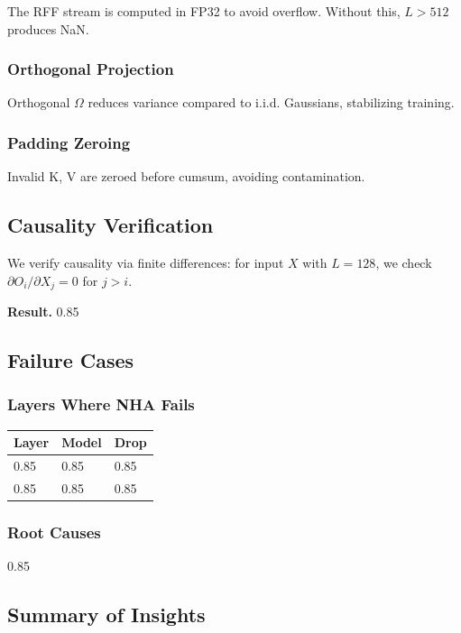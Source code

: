 The RFF stream is computed in FP32 to avoid overflow. Without this, 
$L > 512$ produces NaN.

\subsubsection{Orthogonal Projection}

Orthogonal $\Omega$ reduces variance compared to i.i.d. Gaussians, 
stabilizing training.

\subsubsection{Padding Zeroing}

Invalid K, V are zeroed before cumsum, avoiding contamination.

\subsection{Causality Verification}

We verify causality via finite differences: for input $X$ with $L = 128$, 
we check $\partial O_i / \partial X_j = 0$ for $j > i$.

\textbf{Result.} 0.85

\subsection{Failure Cases}

\subsubsection{Layers Where NHA Fails}

\begin{table}[H]
\centering
\small
\begin{tabular}{lll}
\toprule
\textbf{Layer} & \textbf{Model} & \textbf{Drop} \\
\midrule
0.85 & 0.85 & 0.85 \\
0.85 & 0.85 & 0.85 \\
\bottomrule
\end{tabular}
\end{table}

\subsubsection{Root Causes}

0.85

\subsection{Summary of Insights}

